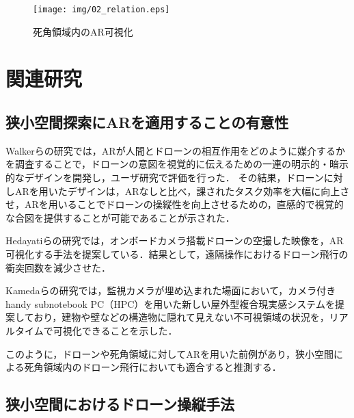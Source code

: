 \documentclass[submit]{ipsj}
\begin{document}

\begin{figure}[tb]
  \centering
  \texttt{[image: img/02\_relation.eps]}
  \caption{死角領域内のAR可視化}
  \label{fig:02_relation}
  \end{figure}
  

\section{関連研究}
\subsection{狭小空間探索にARを適用することの有意性}
Walkerらの研究\cite{Walker}では，ARが人間とドローンの相互作用をどのように媒介するかを調査することで，ドローンの意図を視覚的に伝えるための一連の明示的・暗示的なデザインを開発し，ユーザ研究で評価を行った．
その結果，ドローンに対しARを用いたデザインは，ARなしと比べ，課されたタスク効率を大幅に向上させ，ARを用いることでドローンの操縦性を向上させるための，直感的で視覚的な合図を提供することが可能であることが示された．

Hedayatiらの研究\cite{Hedayati}では，オンボードカメラ搭載ドローンの空撮した映像を，AR可視化する手法を提案している．結果として，遠隔操作におけるドローン飛行の衝突回数を減少させた．

Kamedaらの研究\cite{Kameda}では，監視カメラが埋め込まれた場面において，カメラ付きhandy subnotebook PC（HPC）を用いた新しい屋外型複合現実感システムを提案しており，建物や壁などの構造物に隠れて見えない不可視領域の状況を，リアルタイムで可視化できることを示した．

このように，ドローンや死角領域に対してARを用いた前例があり，狭小空間による死角領域内のドローン飛行においても適合すると推測する．

\subsection{狭小空間におけるドローン操縦手法}
\end{document}
